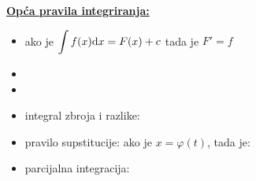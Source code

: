\documentclass[12pt,oneside,a4paper]{report}
\begin{document}
\hfill{}
\newpage
\begin{center}
\end{center}

\noindent
\textbf{\underline{Op\'{c}a pravila integriranja:}}
\begin{itemize}
\item ako je $\displaystyle \int f(x)\textrm dx =F(x)+c$ tada je $F'=f$
\item {}
\item{}
\item integral zbroja i razlike: 
\item pravilo supstitucije: ako je $x=\varphi (t)$, tada je: 
\item parcijalna integracija: 
\end{itemize}
\end{document}
